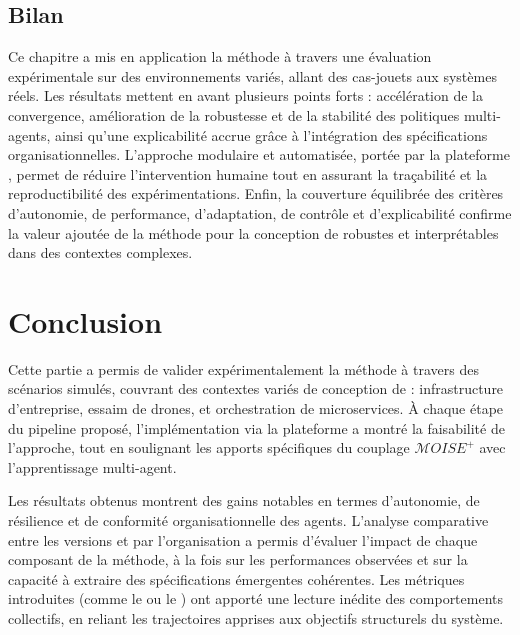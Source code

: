\section{Bilan}

Ce chapitre a mis en application la méthode  à travers une évaluation expérimentale sur des environnements variés, allant des cas-jouets aux systèmes réels. Les résultats mettent en avant plusieurs points forts : accélération de la convergence, amélioration de la robustesse et de la stabilité des politiques multi-agents, ainsi qu'une explicabilité accrue grâce à l'intégration des spécifications organisationnelles. L'approche modulaire et automatisée, portée par la plateforme , permet de réduire l'intervention humaine tout en assurant la traçabilité et la reproductibilité des expérimentations. Enfin, la couverture équilibrée des critères d'autonomie, de performance, d'adaptation, de contrôle et d'explicabilité confirme la valeur ajoutée de la méthode pour la conception de  robustes et interprétables dans des contextes complexes.

\clearpage
\thispagestyle{empty}
\null
\newpage


\chapter*{Conclusion}

Cette partie a permis de valider expérimentalement la méthode  à travers des scénarios simulés, couvrant des contextes variés de conception de  : infrastructure d'entreprise, essaim de drones, et orchestration de microservices. À chaque étape du pipeline proposé, l'implémentation via la plateforme  a montré la faisabilité de l'approche, tout en soulignant les apports spécifiques du couplage $\mathcal{M}OISE^+$ avec l'apprentissage multi-agent.

Les résultats obtenus montrent des gains notables en termes d'autonomie, de résilience et de conformité organisationnelle des agents. L'analyse comparative entre les versions  et  par l'organisation a permis d'évaluer l'impact de chaque composant de la méthode, à la fois sur les performances observées et sur la capacité à extraire des spécifications émergentes cohérentes. Les métriques introduites (comme le  ou le ) ont apporté une lecture inédite des comportements collectifs, en reliant les trajectoires apprises aux objectifs structurels du système.

